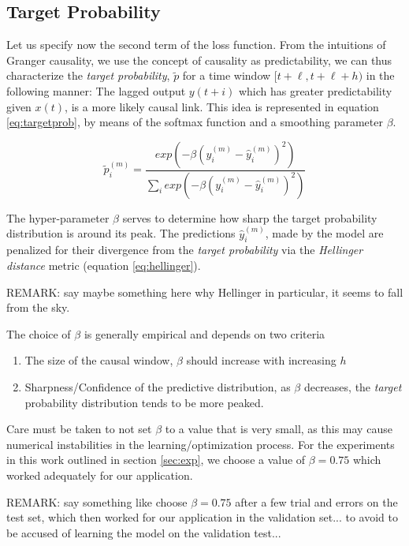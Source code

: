 \documentclass[twoside]{article}
\begin{document}
\subsection{Target Probability}

Let us specify now the second term of the loss function.
From the intuitions of Granger causality, we use the concept of causality as predictability, we can thus characterize 
the \emph{target probability}, $\widetilde{p}$ for a time window $[t+\ell, t+\ell+h)$ in the following manner: 
The lagged output $y(t+i)$ which has greater predictability given $x(t)$, is a more likely causal link. This idea is represented
in equation \ref{eq:targetprob}, by means of the softmax function and a smoothing parameter $\beta$.

\begin{equation}\label{eq:targetprob}
\widetilde{p}_{i}^{(m)} = \frac{exp \left(- \beta (y_{i}^{(m)} - \hat{y}_{i}^{(m)})^{2} \right)}{\sum_{i}{exp \left(- \beta (y_{i}^{(m)} - \hat{y}_{i}^{(m)})^{2} \right)}} 
\end{equation}

The hyper-parameter $\beta$ serves to determine how sharp the target probability distribution is around its peak. 
The predictions $\hat{y}^{(m)}_{i}$, made by the model are penalized for their divergence from the \emph{target probability} via 
the \emph{Hellinger distance} metric (equation \ref{eq:hellinger}).

REMARK: say maybe something here why Hellinger in particular, it seems to fall from the sky.


The choice of $\beta$ is generally empirical and depends on two criteria 
\begin{enumerate} \item The size of the causal window, $\beta$ should increase with increasing $h$ 
\item Sharpness/Confidence of the predictive distribution, as $\beta$ decreases, the \emph{target} probability distribution tends to be more peaked.  \end{enumerate}

Care must be taken to not set $\beta$ to a value that is very small, as this may cause numerical instabilities in the learning/optimization process. 
For the experiments in this work outlined in section \ref{sec:exp}, we choose a value of $\beta = 0.75$ which worked adequately for our application.


REMARK: say something like choose $\beta =0.75$ after a few trial and errors on the test set, which then worked for our application in the validation set...
to avoid to be accused of learning the model on the validation test...
\end{document}
